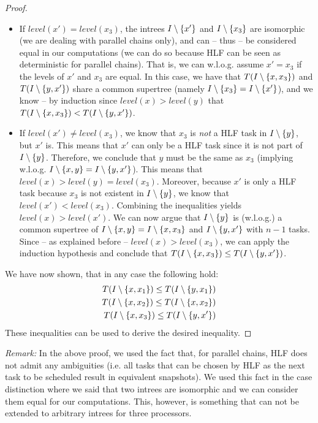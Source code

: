 \begin{proof}
  \begin{itemize}
  \item  If $level(x')=level(x_3)$, the intrees $I\setminus\{x'\}$ and $I\setminus\{x_3\}$ are isomorphic (we are dealing with parallel chains only), and can -- thus -- be considered equal in our computations (we can do so because HLF can be seen as deterministic for parallel chains). That is, we can w.l.o.g. assume $x'=x_3$ if the levels of $x'$ and $x_3$ are equal. In this case, we have that $T(I\setminus\{x, x_3\})$ and $T(I\setminus\{y, x'\})$ share a common supertree (namely $I\setminus\{x_3\}=I\setminus\{x'\}$), and we know -- by induction since $level(x)>level(y)$ that $T(I\setminus\{x, x_3\}) < T(I\setminus\{y, x'\})$.
  \item   If $level(x') \neq level(x_3)$, we know that $x_3$ is \emph{not} a HLF task in $I\setminus\{y\}$, but $x'$ is. This means that $x'$ can only be a HLF task since it is not part of $I\setminus\{y\}$. Therefore, we conclude that $y$ must be the same as $x_3$ (implying w.l.o.g. $I\setminus\{x,y\}=I\setminus\{y,x'\}$). This means that $level(x)>level(y)=level(x_3)$. Moreover, because $x'$ is only a HLF task because $x_3$ is not existent in $I\setminus\{y\}$, we know that $level(x') < level(x_3)$. Combining the inequalities yields $level(x)>level(x')$. We can now argue that $I\setminus\{y\}$ is (w.l.o.g.) a common supertree of $I\setminus\{x,y\}=I\setminus\{x,x_3\}$ and $I\setminus\{y,x'\}$ with $n-1$ tasks. Since -- as explained before -- $level(x) > level(x_3)$, we can apply the induction hypothesis and conclude that $T(I\setminus\{x, x_3\}) \leq T(I\setminus\{y, x'\})$.
  \end{itemize}

  We have now shown, that in any case the following hold:
  \begin{eqnarray*} 
    T(I\setminus\{x, x_1\}) \leq T(I\setminus\{y, x_1\}) \\
    T(I\setminus\{x, x_2\}) \leq T(I\setminus\{x, x_2\}) \\
    T(I\setminus\{x, x_3\}) \leq T(I\setminus\{y, x'\})
  \end{eqnarray*}
  These inequalities can be used to derive the desired inequality.
\end{proof}

\emph{Remark:} In the above proof, we used the fact that, for parallel chains, HLF does not admit any ambiguities (i.e. all tasks that can be chosen by HLF as the next task to be scheduled result in equivalent snapshots). We used this fact in the case distinction where we said that two intrees are isomorphic and we can consider them equal for our computations. This, however, is something that can not be extended to arbitrary intrees for three processors.

